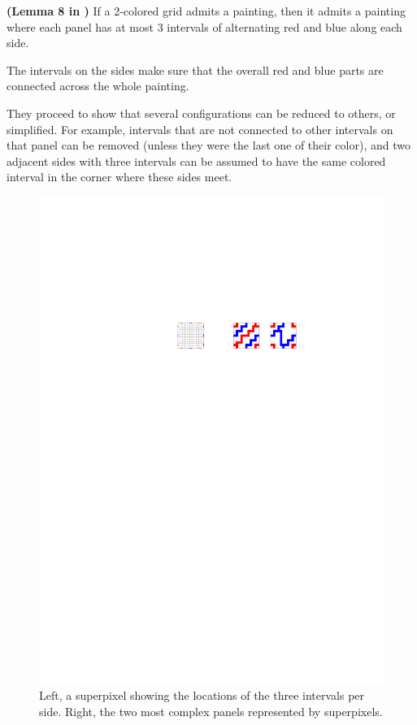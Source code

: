 \documentclass[a4paper,UKenglish,cleveref]{lipics-v2019}
\begin{document}
\begin{lemma} {\bf (Lemma 8 in \cite{goethem2017painter})}
\label{lem:painting}
If a 2-colored grid admits a painting, then it admits a painting where each panel has at most 3 intervals of alternating red and blue along each side.
\end{lemma}

The intervals on the sides make sure that the overall red and blue parts are connected across the whole painting.

They proceed to show that several configurations can be reduced to others, or simplified. For example, intervals that are not connected to other intervals on that panel can be removed (unless they were the last one of their color), and two adjacent sides with three intervals can be assumed to have the same colored interval in the corner where these sides meet.

\begin{figure}[tb]
\centering
\includegraphics[]{painter-panels.pdf}
\caption{Left, a superpixel showing the locations of the three intervals per side. Right, the two most complex panels represented by superpixels.}
\label{fig:panel}
\end{figure}
\end{document}
